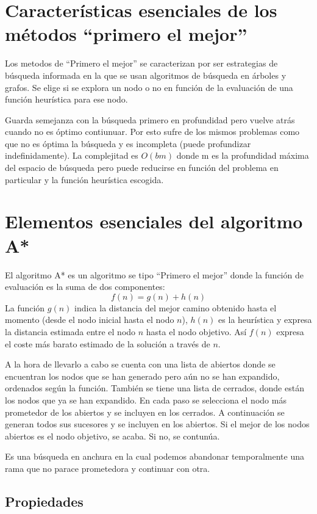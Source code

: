 \documentclass[12pt]{article}
\begin{document}
\section{Características esenciales de los métodos “primero el mejor”}

Los metodos de ``Primero el mejor'' se caracterizan por ser
estrategias de búsqueda informada en la que se usan algoritmos de
búsqueda en árboles y grafos. Se elige si se explora un nodo o no en
función de la evaluación de una función heurística para ese nodo.

Guarda semejanza con la búsqueda primero en profundidad pero vuelve
atrás cuando no es óptimo contiunuar. Por esto sufre de los mismos
problemas como que no es óptima la búsqueda y es incompleta (puede
profundizar indefinidamente). La complejitad es $O(bm)$ donde m es la
profundidad máxima del espacio de búsqueda pero puede reducirse en
función del problema en particular y la función heurística escogida.

\section{Elementos esenciales del algoritmo A*}

El algoritmo A* es un algoritmo se tipo ``Primero el mejor'' donde la
función de evaluación es la suma de dos componentes:$$f(n)=g(n)+h(n)$$
La función $g(n)$ indica la distancia del mejor camino obtenido hasta
el momento (desde el nodo inicial hasta el nodo $n$), $h(n)$ es la
heurística y expresa la distancia estimada entre el nodo $n$ hasta el
nodo objetivo. Así $f(n)$ expresa el coste más barato estimado de la
solución a través de $n$.

A la hora de llevarlo a cabo se cuenta con una lista de abiertos donde
se encuentran los nodos que se han generado pero aún no se han
expandido, ordenados según la función. También se tiene una lista de
cerrados, donde están los nodos que ya se han expandido. En cada paso
se selecciona el nodo más prometedor de los abiertos y se incluyen en
los cerrados. A continuación se generan todos sus sucesores y se
incluyen en los abiertos. Si el mejor de los nodos abiertos es el nodo
objetivo, se acaba. Si no, se contunúa.

Es una búsqueda en anchura en la cual podemos abandonar temporalmente
una rama que no parace prometedora y continuar con otra.

\subsection{Propiedades}
\end{document}
